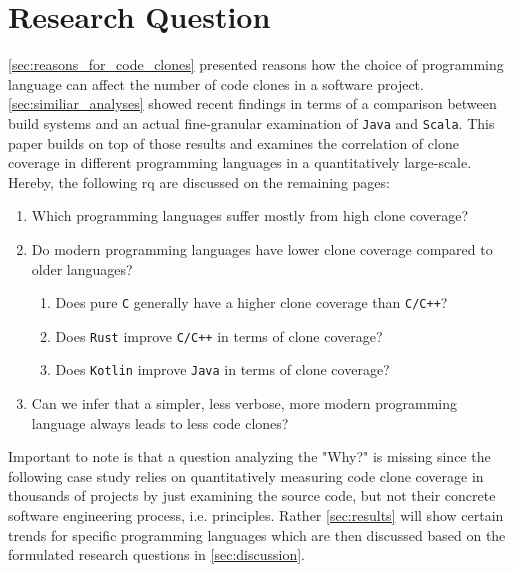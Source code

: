 
\section{Research Question}
\label{sec:research_question}

\autoref{sec:reasons_for_code_clones} presented reasons how the choice of programming language can affect the number of code clones in a software project. \autoref{sec:similiar_analyses} showed recent findings in terms of a comparison between build systems and an actual fine-granular examination of \texttt{Java} and \texttt{Scala}.
This paper builds on top of those results and examines the correlation of clone coverage in different programming languages in a quantitatively large-scale. Hereby, the following \ac{rq} are discussed on the remaining pages:

\begin{enumerate}
	\item Which programming languages suffer mostly from high clone coverage?
	\item Do modern programming languages have lower clone coverage compared to older languages?
	\begin{enumerate}
		\item Does pure \texttt{C} generally have a higher clone coverage than \texttt{C/C++}?
		\item Does \texttt{Rust} improve \texttt{C/C++} in terms of clone coverage?
		\item Does \texttt{Kotlin} improve \texttt{Java} in terms of clone coverage?
	\end{enumerate}
	\item Can we infer that a simpler, less verbose, more modern programming language always leads to less code clones?
\end{enumerate}

Important to note is that a question analyzing the "Why?" is missing since the following case study relies on quantitatively measuring code clone coverage in thousands of projects by just examining the source code, but not their concrete software engineering process, i.e. principles. Rather \autoref{sec:results} will show certain trends for specific programming languages which are then discussed based on the formulated research questions in \autoref{sec:discussion}.